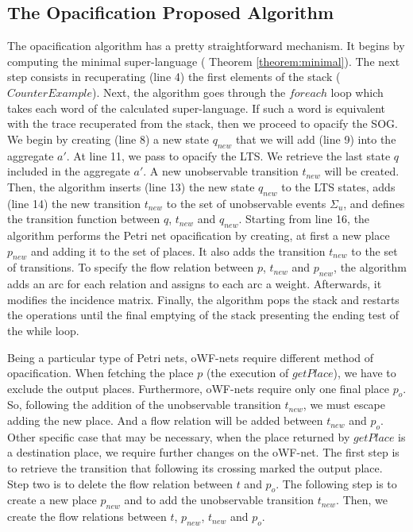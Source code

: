 \subsection{The Opacification Proposed Algorithm}
The opacification algorithm has a pretty straightforward mechanism. It begins by computing the minimal super-language ( Theorem \ref{theorem:minimal}). The next step consists in recuperating (line 4) the first elements of the stack ($CounterExample$). Next, the algorithm goes through the $foreach$ loop which takes each word of the calculated super-language. If such a word is equivalent with the trace recuperated from the stack, then we proceed to opacify the SOG. We begin by creating (line 8) a new state $q_{new}$ that we will add (line 9) into the aggregate $a'$.
At line 11, we pass to opacify the LTS. We retrieve the last state $q$ included in the aggregate $a'$. A new unobservable transition $t_{new}$ will be created. Then, the algorithm inserts (line 13) the new state $q_{new}$ to the LTS states, adds (line 14) the new transition $t_{new}$ to the set of unobservable events $\Sigma_{u}$, and defines the transition function between $q$, $t_{new}$ and $q_{new}$. 
Starting from line 16, the algorithm performs the Petri net opacification by creating, at first a new place $p_{new}$ and adding it to the set of places. It also adds the transition $t_{new}$ to the set of transitions. To specify the flow relation between $p$, $t_{new}$ and $p_{new}$, the algorithm adds an arc for each relation and assigns to each arc a weight. Afterwards, it modifies the incidence matrix. Finally, the algorithm pops the stack and restarts the operations until the final emptying of the stack presenting the ending test of the while loop.

Being a particular type of Petri nets, oWF-nets require different method of opacification. When fetching the place $p$ (the execution of $getPlace$), we have to exclude the output places. Furthermore, oWF-nets require only one final place $p_o$. So, following the addition of the unobservable transition $t_{new}$, we must escape adding the new place. And a flow relation will be added between $t_{new}$ and $p_o$. Other specific case that may be necessary,  when the place returned by $getPlace$ is a destination place, we require further changes on the oWF-net. The first step is to retrieve the transition that following its crossing marked the output place. Step two is to delete the flow relation between $t$ and $p_o$. The following step is to create a new place $p_{new}$ and to add the unobservable transition $t_{new}$. Then, we create the flow relations between $t$, $p_{new}$, $t_{new}$ and $p_o$.
